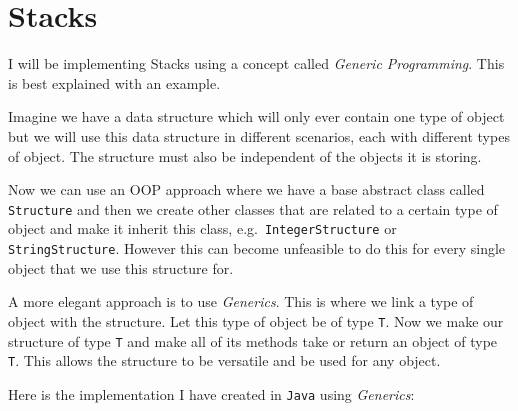 \documentclass[../../../../main.tex]{subfiles}
\begin{document}
\section{Stacks}
I will be implementing Stacks using a concept called \textit{Generic Programming\cite{generics}}. This is best explained with an example.

Imagine we have a data structure which will only ever contain one type of object but we will use this data structure in different scenarios, each with different types of object. The structure must also be independent of the objects it is storing.

Now we can use an OOP approach where we have a base abstract class called \texttt{Structure} and then we create other classes that are related to a certain type of object and make it inherit this class, e.g.\ \texttt{IntegerStructure} or \texttt{StringStructure}. However this can become unfeasible to do this for every single object that we use this structure for.
 
 A more elegant approach is to use \textit{Generics}. This is where we link a type of object with the structure. Let this type of object be of type \texttt{T}. Now we make our structure of type \texttt{T} and make all of its methods take or return an object of type \texttt{T}. This allows the structure to be versatile and be used for any object.

Here is the implementation I have created in \texttt{Java} using \textit{Generics\cite{genericsJava}}:
\end{document}
